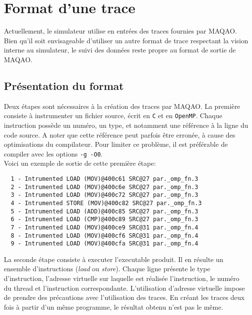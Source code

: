 \section{Format d'une trace}
Actuellement, le simulateur utilise en entrées des traces fournies par \textsf{MAQAO}. Bien qu'il soit envisageable d'utiliser un autre format de trace respectant la vision interne au simulateur, le suivi des données reste propre au format de sortie de \textsf{MAQAO}.

\subsection{Présentation du format}
Deux étapes sont nécessaires à la création des traces par \textsf{MAQAO}. La première consiste à instrumenter un fichier source, écrit en \texttt{C} et en \texttt{OpenMP}. Chaque instruction possède un numéro, un type, et notamment une référence à la ligne du code source. A noter que cette référence peut parfois être erronée, à cause des optimisations du compilateur. Pour limiter ce problème, il est préférable de compiler avec les options \texttt{-g -O0}. \\

Voici un exemple de sortie de cette première étape: \\
\begin{framed}
\begin{verbatim}
  1 - Intrumented LOAD (MOV)@400c61 SRC@27 par._omp_fn.3
  2 - Intrumented LOAD (MOV)@400c6e SRC@27 par._omp_fn.3
  3 - Intrumented LOAD (MOV)@400c72 SRC@27 par._omp_fn.3
  4 - Intrumented STORE (MOV)@400c82 SRC@27 par._omp_fn.3
  5 - Intrumented LOAD (ADD)@400c85 SRC@27 par._omp_fn.3
  6 - Intrumented LOAD (CMP)@400c89 SRC@27 par._omp_fn.3
  7 - Intrumented LOAD (MOV)@400ce9 SRC@31 par._omp_fn.4
  8 - Intrumented LOAD (MOV)@400cf6 SRC@31 par._omp_fn.4
  9 - Intrumented LOAD (MOV)@400cfa SRC@31 par._omp_fn.4
\end{verbatim}
\end{framed}

La seconde étape consiste à executer l'executable produit. Il en résulte un ensemble d'instructions (\emph{load} ou \emph{store}). Chaque ligne présente le type d'instruction, l'adresse virtuelle sur laquelle est réalisée l'instruction, le numéro du thread et l'instruction correspondante. L'utilisation d'adresse virtuelle impose de prendre des précautions avec l'utilisation des traces. En créant les traces deux fois à partir d'un même programme, le résultat obtenu n'est pas le même.\\

